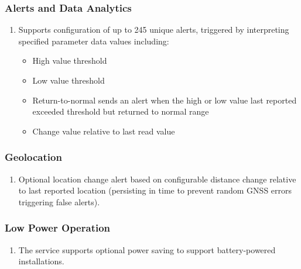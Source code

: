 \documentclass[letterpaper,10pt,english]{sphinxmanual}
\begin{document}
\subsubsection{Alerts and Data Analytics}
\label{\detokenize{funcspec:alerts-and-data-analytics}}\begin{enumerate}
\item {} 
Supports configuration of up to 245 unique alerts, triggered by interpreting specified parameter data values including:
\begin{itemize}
\item {} 
High value threshold

\item {} 
Low value threshold

\item {} 
Return-to-normal sends an alert when the high or low value last reported exceeded threshold but returned to normal range

\item {} 
Change value relative to last read value

\end{itemize}

\end{enumerate}


\subsubsection{Geolocation}
\label{\detokenize{funcspec:geolocation}}\begin{enumerate}
\item {} 
Optional location change alert based on configurable distance change relative to last reported location (persisting in time to prevent random GNSS errors triggering false alerts).

\end{enumerate}


\subsubsection{Low Power Operation}
\label{\detokenize{funcspec:id1}}\begin{enumerate}
\item {} 
The service supports optional power saving to support battery-powered installations.

\end{enumerate}
\end{document}
